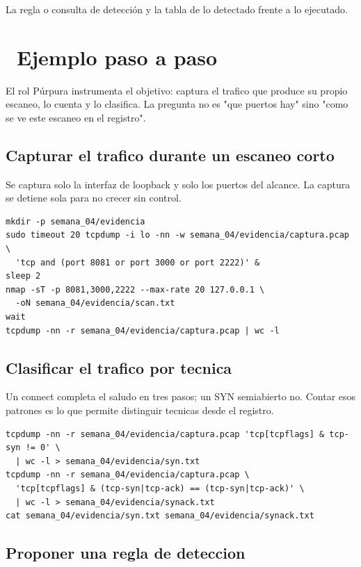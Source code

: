 \documentclass[11pt,a4paper]{article}
\newcommand{\iconotexto}[2]{\textcolor{cyanNeon}{\faIcon{#1}}~#2}
\begin{document}
La regla o consulta de detección y la tabla de lo detectado frente a lo ejecutado.

\section{\iconotexto{list-ol}{Ejemplo paso a paso}}

El rol Púrpura instrumenta el objetivo: captura el trafico que produce su propio escaneo, lo cuenta y lo clasifica. La pregunta no es "que puertos hay" sino "como se ve este escaneo en el registro".

\subsection{Capturar el trafico durante un escaneo corto}

Se captura solo la interfaz de loopback y solo los puertos del alcance. La captura se detiene sola para no crecer sin control.

\begin{lstlisting}[style=estiloCodigo]
mkdir -p semana_04/evidencia
sudo timeout 20 tcpdump -i lo -nn -w semana_04/evidencia/captura.pcap \
  'tcp and (port 8081 or port 3000 or port 2222)' &
sleep 2
nmap -sT -p 8081,3000,2222 --max-rate 20 127.0.0.1 \
  -oN semana_04/evidencia/scan.txt
wait
tcpdump -nn -r semana_04/evidencia/captura.pcap | wc -l
\end{lstlisting}

\subsection{Clasificar el trafico por tecnica}

Un connect completa el saludo en tres pasos; un SYN semiabierto no. Contar esos patrones es lo que permite distinguir tecnicas desde el registro.

\begin{lstlisting}[style=estiloCodigo]
tcpdump -nn -r semana_04/evidencia/captura.pcap 'tcp[tcpflags] & tcp-syn != 0' \
  | wc -l > semana_04/evidencia/syn.txt
tcpdump -nn -r semana_04/evidencia/captura.pcap \
  'tcp[tcpflags] & (tcp-syn|tcp-ack) == (tcp-syn|tcp-ack)' \
  | wc -l > semana_04/evidencia/synack.txt
cat semana_04/evidencia/syn.txt semana_04/evidencia/synack.txt
\end{lstlisting}

\subsection{Proponer una regla de deteccion}
\end{document}
